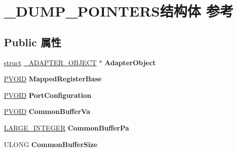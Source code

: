 \hypertarget{struct___d_u_m_p___p_o_i_n_t_e_r_s}{}\section{\+\_\+\+D\+U\+M\+P\+\_\+\+P\+O\+I\+N\+T\+E\+R\+S结构体 参考}
\label{struct___d_u_m_p___p_o_i_n_t_e_r_s}
\subsection*{Public 属性}
\begin{DoxyCompactItemize}
\item 
\mbox{\label{struct___d_u_m_p___p_o_i_n_t_e_r_s_ac62a9f4ec7607b567e0c0ae68b6b022a}} 
\hyperlink{interfacestruct}{struct} \hyperlink{struct___a_d_a_p_t_e_r___o_b_j_e_c_t}{\+\_\+\+A\+D\+A\+P\+T\+E\+R\+\_\+\+O\+B\+J\+E\+CT} $\ast$ {\bfseries Adapter\+Object}
\item 
\mbox{\label{struct___d_u_m_p___p_o_i_n_t_e_r_s_ae64588f536dd7d88e9da62ce6df4ea9a}} 
\hyperlink{interfacevoid}{P\+V\+O\+ID} {\bfseries Mapped\+Register\+Base}
\item 
\mbox{\label{struct___d_u_m_p___p_o_i_n_t_e_r_s_a44cfcfe7ca966bd885bb247bcf61c403}} 
\hyperlink{interfacevoid}{P\+V\+O\+ID} {\bfseries Port\+Configuration}
\item 
\mbox{\label{struct___d_u_m_p___p_o_i_n_t_e_r_s_a0aa8657431848356886b1f06c49b6a84}} 
\hyperlink{interfacevoid}{P\+V\+O\+ID} {\bfseries Common\+Buffer\+Va}
\item 
\mbox{\label{struct___d_u_m_p___p_o_i_n_t_e_r_s_a9a41775da7ee55043f0354e853030a85}} 
\hyperlink{union___l_a_r_g_e___i_n_t_e_g_e_r}{L\+A\+R\+G\+E\+\_\+\+I\+N\+T\+E\+G\+ER} {\bfseries Common\+Buffer\+Pa}
\item 
\mbox{\label{struct___d_u_m_p___p_o_i_n_t_e_r_s_aede54a43087c12bac47edae21599b958}} 
U\+L\+O\+NG {\bfseries Common\+Buffer\+Size}
\item 
\mbox{\label{struct___d_u_m_p___p_o_i_n_t_e_r_s_aa95fa63d9b76f7c4dcef5f2ba5168f92}} 

\end{DoxyCompactItemize}
